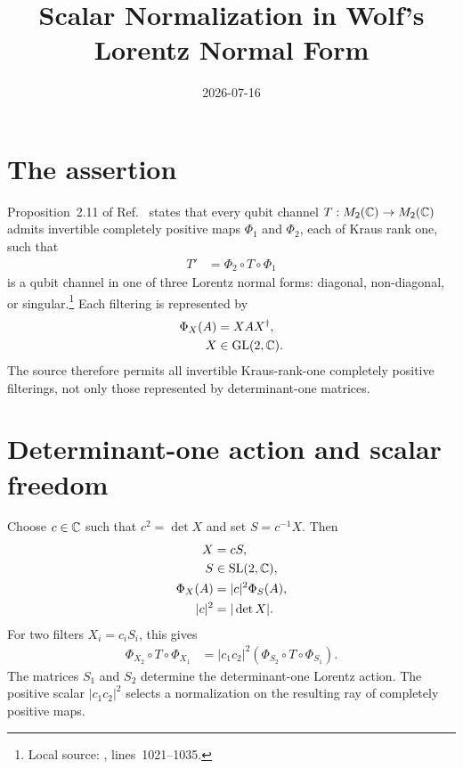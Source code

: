 \documentclass{article}
\title{Scalar Normalization in Wolf's Lorentz Normal Form}
\author{}
\date{2026-07-16}
\begin{document}
\maketitle
{}

\section{The assertion}

Proposition~2.11 of Ref.~\cite{Wolf2012Quantum} states that every qubit
channel $T:M_{2}(\mathbb{C})\to M_{2}(\mathbb{C})$ admits invertible completely positive maps
$\Phi_1$ and $\Phi_2$, each of Kraus rank one, such that
\begin{align}
    T'
        &=\Phi_2\circ T\circ\Phi_1
    \label{eq:wolf_prop2_11_lorentz_scalar_filtering_gap_filtered_channel}
\end{align}
is a qubit channel in one of three Lorentz normal forms: diagonal,
non-diagonal, or singular.\footnote{Local source:
, lines~1021--1035.}
Each filtering is represented by
\begin{align}
    \Phi_X(A)
        &=XAX^\dagger,
    \label{eq:wolf_prop2_11_lorentz_scalar_filtering_gap_general_filter}\\
    X
        &\in\operatorname{GL}(2,\mathbb{C}).
    \label{eq:wolf_prop2_11_lorentz_scalar_filtering_gap_invertible_matrix}
\end{align}
The source therefore permits all invertible Kraus-rank-one completely positive
filterings, not only those represented by determinant-one matrices.

\section{Determinant-one action and scalar freedom}

Choose $c\in\mathbb{C}$ such that $c^2=\det X$ and set $S=c^{-1}X$. Then
\begin{align}
    X
        &=cS,
    \label{eq:wolf_prop2_11_lorentz_scalar_filtering_gap_matrix_factorization}\\
    S
        &\in\operatorname{SL}(2,\mathbb{C}),
    \label{eq:wolf_prop2_11_lorentz_scalar_filtering_gap_special_linear_factor}\\
    \Phi_X(A)
        &=|c|^2\Phi_S(A),
    \label{eq:wolf_prop2_11_lorentz_scalar_filtering_gap_filter_factorization}\\
    |c|^2
        &=|\det X|.
    \label{eq:wolf_prop2_11_lorentz_scalar_filtering_gap_scalar_determinant}
\end{align}
For two filters $X_i=c_iS_i$, this gives
\begin{align}
    \Phi_{X_2}\circ T\circ\Phi_{X_1}
        &=|c_1c_2|^2
          (\Phi_{S_2}\circ T\circ\Phi_{S_1}).
    \label{eq:wolf_prop2_11_lorentz_scalar_filtering_gap_two_filter_scalar}
\end{align}
The matrices $S_1$ and $S_2$ determine the determinant-one Lorentz action.
The positive scalar $|c_1c_2|^2$ selects a normalization on the resulting ray
of completely positive maps.
\end{document}
